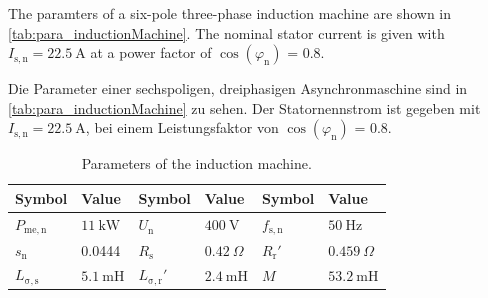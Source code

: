 %
%
The paramters of a six-pole three-phase induction machine are shown in \autoref{tab:para_inductionMachine}. The nominal stator current is given with $I_{\mathrm{s,n}} = \SI{22.5}{\ampere}$ at a power factor of $\cos(\varphi_{\mathrm{n}})$ = 0.8.

\begin{germanblock}
Die Parameter einer sechspoligen, dreiphasigen Asynchronmaschine sind in \autoref{tab:para_inductionMachine} zu sehen. Der Statornennstrom ist gegeben mit $I_{\mathrm{s,n}} = \SI{22,5}{\ampere}$, bei einem Leistungsfaktor von $\cos(\varphi_{\mathrm{n}})$ = 0.8.    
\end{germanblock}

\begin{table}[htb]
    \caption{Parameters of the induction machine.}
    \centering
    \begin{tabular}{llllll}\toprule
    Symbol       & Value    & Symbol    & Value & Symbol    & Value \\
    \midrule
    $P_{\mathrm{me,n}}$    & $\SI{11}{\kilo\watt}$ & $U_{\mathrm{n}}$   & $\SI{400}{\volt}$ &
    $f_{\mathrm{s,n}}$       & $\SI{50}{\hertz}$       \\ $s_{\mathrm{n}}$    & 0.0444 &
    $R_{\mathrm{s}}$       & $\SI{0.42}{\Omega}$    & $R_{\mathrm{r}}'$    & $\SI{0.459}{\Omega}$ \\
    $L_{\mathrm{\sigma,s}}$  & $\SI{5.1}{\milli\henry}$  & $L_{\mathrm{\sigma,r}}'$    & $\SI{2.4}{\milli\henry}$ &
    $M$ & $\SI{53.2}{\milli\henry}$ \\
    \bottomrule
    \end{tabular}
    \label{tab:para_inductionMachine}
\end{table}
\vspace{-1.3em}

